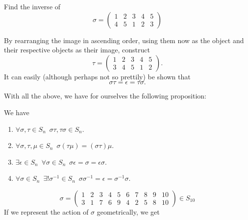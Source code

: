 \documentclass[notoc,notitlepage]{tufte-book}
\begin{document}
\begin{eg}
  \label{eg:inverse_permutation}
  Find the inverse of
  \begin{equation*}
    \sigma = \begin{pmatrix}
      1 & 2 & 3 & 4 & 5 \\
      4 & 5 & 1 & 2 & 3
    \end{pmatrix}
  \end{equation*}

  \begin{solution}
    By rearranging the image in ascending order, using them now as the object and their respective objects as their image, construct
    \begin{equation*}
      \tau = \begin{pmatrix}
        1 & 2 & 3 & 4 & 5 \\
        3 & 4 & 5 & 1 & 2
      \end{pmatrix}.
    \end{equation*}
    It can easily (although perhaps not so prettily) be shown that
    \begin{equation*}
      \sigma \tau = \epsilon = \tau \sigma.
    \end{equation*}
  \end{solution}
\end{eg}

With all the above, we have for ourselves the following proposition:

\begin{propo}[Properties of $S_n$]\label{propo:properties_of_Sn}
  We have
  \begin{enumerate}
    \item $\forall \sigma, \tau \in S_n \enspace \sigma \tau, \tau \sigma \in S_n$.
    \item $\forall \sigma, \tau, \mu \in S_n \enspace \sigma (\tau \mu) = (\sigma \tau) \mu$.
    \item $\exists \epsilon \in S_n \enspace \forall \sigma \in S_n \enspace \sigma \epsilon = \sigma = \epsilon \sigma$.
    \item $\forall \sigma \in S_n \enspace \exists! \sigma^{-1} \in S_n \enspace \sigma \sigma^{-1} = \epsilon = \sigma^{-1} \sigma$.
  \end{enumerate}
\end{propo}

\begin{equation*}
  \sigma = \begin{pmatrix}
    1 & 2 & 3 & 4 & 5 & 6 & 7 & 8 & 9 & 10 \\
    3 & 1 & 7 & 6 & 9 & 4 & 2 & 5 & 8 & 10
  \end{pmatrix} \in S_{10}
\end{equation*}
If we represent the action of $\sigma$ geometrically, we get
\end{document}
